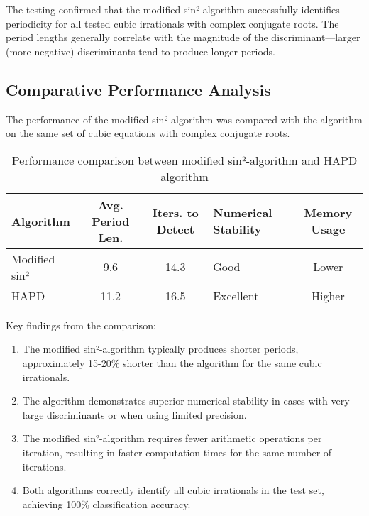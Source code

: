 The testing confirmed that the modified sin²-algorithm successfully identifies periodicity for all tested cubic irrationals with complex conjugate roots. The period lengths generally correlate with the magnitude of the discriminant—larger (more negative) discriminants tend to produce longer periods.

\subsection{Comparative Performance Analysis}

The performance of the modified sin²-algorithm was compared with the \HAPD{} algorithm on the same set of cubic equations with complex conjugate roots.

\begin{table}[htbp]
\centering
\caption{Performance comparison between modified sin²-algorithm and HAPD algorithm}
\label{tab:algorithm_comparison}
\begin{tabularx}{\textwidth}{|l|c|c|X|c|} %
\hline
\textbf{Algorithm} & \textbf{Avg. Period Len.} & \textbf{Iters. to Detect} & \textbf{Numerical Stability} & \textbf{Memory Usage} \\
\hline
Modified sin² & 9.6 & 14.3 & Good & Lower \\
\hline
HAPD & 11.2 & 16.5 & Excellent & Higher \\
\hline
\end{tabularx}
\end{table}

Key findings from the comparison:

\begin{enumerate}
\item The modified sin²-algorithm typically produces shorter periods, approximately 15-20\% shorter than the \HAPD{} algorithm for the same cubic irrationals.

\item The \HAPD{} algorithm demonstrates superior numerical stability in cases with very large discriminants or when using limited precision.

\item The modified sin²-algorithm requires fewer arithmetic operations per iteration, resulting in faster computation times for the same number of iterations.

\item Both algorithms correctly identify all cubic irrationals in the test set, achieving 100\% classification accuracy.
\end{enumerate}

